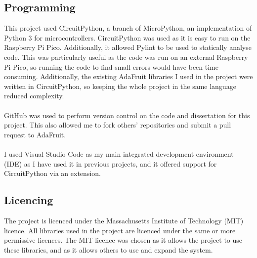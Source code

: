 \documentclass[12pt,a4paper]{report}
\begin{document}
\subsection{Programming}  
This project used CircuitPython, a branch of MicroPython, an implementation of Python 3 for microcontrollers. CircuitPython was used as it is easy to run on the Raspberry Pi Pico. Additionally, it allowed Pylint to be used to statically analyse code. This was particularly useful as the code was run on an external Raspberry Pi Pico, so running the code to find small errors would have been time consuming. Additionally, the existing AdaFruit libraries I used in the project were written in CircuitPython, so keeping the whole project in the same language reduced complexity. \\ \\
GitHub was used to perform version control on the code and dissertation for this project. This also allowed me to fork others' repositories and submit a pull request to AdaFruit. \\ \\ 
I used Visual Studio Code as my main integrated development environment (IDE) as I have used it in previous projects, and it offered support for CircuitPython via an extension.

\subsection{Licencing}
The project is licenced under the Massachusetts Institute of Technology (MIT) licence. All libraries used in the project are licenced under the same or more permissive licences. The MIT licence was chosen as it allows the project to use these libraries, and as it allows others to use and expand the system. \\
\end{document}
